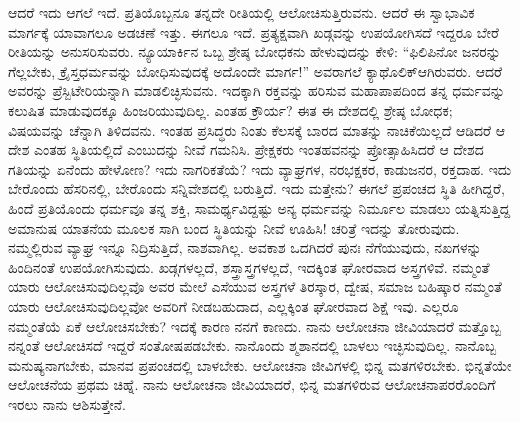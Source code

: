 \vskip 5pt

ಆದರೆ ಇದು ಆಗಲೆ ಇದೆ. ಪ್ರತಿಯೊಬ್ಬನೂ ತನ್ನದೇ ರೀತಿಯಲ್ಲಿ ಆಲೋಚಿಸುತ್ತಿರು\break ವನು. ಆದರೆ ಈ ಸ್ವಾಭಾವಿಕ ಮಾರ್ಗಕ್ಕೆ ಯಾವಾಗಲೂ ಅಡಚಣೆ ಇತ್ತು. ಈಗಲೂ ಇದೆ. ಪ್ರತ್ಯಕ್ಷವಾಗಿ ಖಡ್ಗವನ್ನು ಉಪಯೋಗಿಸದೆ ಇದ್ದರೂ ಬೇರೆ ರೀತಿಯನ್ನು ಅನುಸರಿಸುವರು. ನ್ಯೂಯಾರ್ಕಿನ ಒಬ್ಬ ಶ್ರೇಷ್ಠ ಬೋಧಕನು ಹೇಳುವುದನ್ನು ಕೇಳಿ: “ಫಿಲಿಪಿನೋ ಜನರನ್ನು ಗೆಲ್ಲಬೇಕು, ಕ್ರೈಸ್ತಧರ್ಮವನ್ನು ಬೋಧಿಸುವುದಕ್ಕೆ ಅದೊಂದೇ ಮಾರ್ಗ!” ಅವರಾಗಲೆ ಕ್ಯಾಥೊಲಿಕ್​ ಆಗಿರುವರು. ಆದರೆ ಅವರನ್ನು ಪ್ರೆಸ್ಬಿಟೇರಿಯನ್ನಾಗಿ ಮಾಡಲಿಚ್ಛಿಸುವನು. ಇದಕ್ಕಾಗಿ ರಕ್ತವನ್ನು ಹರಿಸುವ ಮಹಾಪಾಪದಿಂದ ತನ್ನ ಧರ್ಮವನ್ನು ಕಲುಷಿತ ಮಾಡುವುದಕ್ಕೂ ಹಿಂಜರಿಯುವುದಿಲ್ಲ. ಎಂತಹ ಕ್ರೌರ್ಯ? ಈತ ಈ ದೇಶದಲ್ಲಿ ಶ್ರೇಷ್ಠ ಬೋಧಕ; ವಿಷಯವನ್ನು ಚೆನ್ನಾಗಿ ತಿಳಿದವನು. ಇಂತಹ ಪ್ರಸಿದ್ಧರು ನಿಂತು ಕೆಲಸಕ್ಕೆ ಬಾರದ ಮಾತನ್ನು ನಾಚಿಕೆಯಿಲ್ಲದೆ ಆಡಿದರೆ ಆ ದೇಶ ಎಂತಹ ಸ್ಥಿತಿಯಲ್ಲಿದೆ ಎಂಬುದನ್ನು ನೀವೆ ಗಮನಿಸಿ. ಪ್ರೇಕ್ಷಕರು ಇಂತಹವನನ್ನು ಪ್ರೋತ್ಸಾಹಿಸಿದರೆ ಆ ದೇಶದ ಗತಿಯನ್ನು ಏನೆಂದು ಹೇಳೋಣ? ಇದು ನಾಗರಿಕತೆಯೆ? ಇದು ವ್ಯಾಘ್ರಗಳ, ನರಭಕ್ಷಕರ, ಕಾಡುಜನರ, ರಕ್ತದಾಹ. ಇದು ಬೇರೊಂದು ಹೆಸರಿನಲ್ಲಿ, ಬೇರೊಂದು ಸನ್ನಿವೇಶದಲ್ಲಿ ಬರುತ್ತಿದೆ. ಇದು ಮತ್ತೇನು? ಈಗಲೆ ಪ್ರಪಂಚದ ಸ್ಥಿತಿ ಹೀಗಿದ್ದರೆ, ಹಿಂದೆ ಪ್ರತಿಯೊಂದು ಧರ್ಮವೂ ತನ್ನ ಶಕ್ತಿ, ಸಾಮರ್ಥ್ಯವಿದ್ದಷ್ಟು ಅನ್ಯ ಧರ್ಮವನ್ನು ನಿರ್ಮೂಲ ಮಾಡಲು ಯತ್ನಿಸುತ್ತಿದ್ದ ಅಮಾನುಷ ಯಾತನೆಯ ಮೂಲಕ ಸಾಗಿ ಬಂದ ಸ್ಥಿತಿಯನ್ನು ನೀವೆ ಊಹಿಸಿ! ಚರಿತ್ರೆ ಇದನ್ನು ತೋರುವುದು. ನಮ್ಮಲ್ಲಿರುವ ವ್ಯಾಘ್ರ ಇನ್ನೂ ನಿದ್ರಿಸುತ್ತಿದೆ, ನಾಶವಾಗಿಲ್ಲ. ಅವಕಾಶ ಒದಗಿದರೆ ಪುನಃ ನೆಗೆಯುವುದು, ನಖಗಳನ್ನು ಹಿಂದಿನಂತೆ ಉಪಯೋಗಿಸುವುದು. ಖಡ್ಗಗಳಲ್ಲದೆ, ಶಸ್ತ್ರಾಸ್ತ್ರಗಳಲ್ಲದೆ, ಇದಕ್ಕಿಂತ ಘೋರವಾದ ಅಸ್ತ್ರಗಳಿವೆ. ನಮ್ಮಂತೆ ಯಾರು ಆಲೋಚಿಸುವುದಿಲ್ಲವೊ ಅವರ ಮೇಲೆ ಎಸೆಯುವ ಅಸ್ತ್ರಗಳೆ ತಿರಸ್ಕಾರ, ದ್ವೇಷ, ಸಮಾಜ ಬಹಿಷ್ಕಾರ ನಮ್ಮಂತೆ ಯಾರು ಆಲೋಚಿಸುವುದಿಲ್ಲವೋ ಅವರಿಗೆ ನೀಡಬಹುದಾದ, ಎಲ್ಲಕ್ಕಿಂತ ಘೋರವಾದ ಶಿಕ್ಷೆ ಇವು. ಎಲ್ಲರೂ ನಮ್ಮಂತೆಯೆ ಏಕೆ ಆಲೋಚಿಸಬೇಕು? ಇದಕ್ಕೆ ಕಾರಣ ನನಗೆ ಕಾಣದು. ನಾನು ಆಲೋಚನಾ ಜೀವಿಯಾದರೆ ಮತ್ತೊಬ್ಬ ನನ್ನಂತೆ ಆಲೋಚಿಸದೆ ಇದ್ದರೆ ಸಂತೋಷಪಡಬೇಕು. ನಾನೊಂದು ಶ್ಮಶಾನದಲ್ಲಿ ಬಾಳಲು ಇಚ್ಛಿಸುವುದಿಲ್ಲ. ನಾನೊಬ್ಬ ಮನುಷ್ಯನಾಗಬೇಕು, ಮಾನವ ಪ್ರಪಂಚದಲ್ಲಿ ಬಾಳಬೇಕು. ಆಲೋಚನಾ ಜೀವಿಗಳಲ್ಲಿ ಭಿನ್ನ ಮತಗಳಿರಬೇಕು. ಭಿನ್ನತೆಯೇ ಆಲೋಚನೆಯ ಪ್ರಥಮ ಚಿಹ್ನೆ. ನಾನು ಆಲೋಚನಾ ಜೀವಿಯಾದರೆ, ಭಿನ್ನ ಮತಗಳಿರುವ ಆಲೋಚನಾಪರರೊಂದಿಗೆ ಇರಲು ನಾನು ಆಶಿಸುತ್ತೇನೆ.

\vskip 5pt

